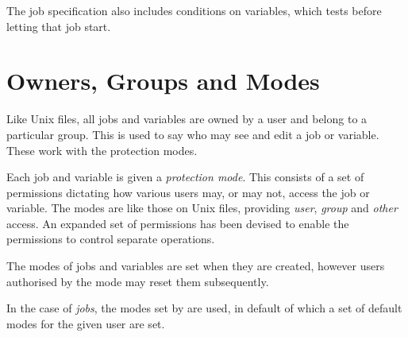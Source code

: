 The job specification also includes conditions on variables, which
\ProductName{} tests before letting that job start.

\section{Owners, Groups and Modes}
Like Unix files, all jobs and variables are owned by a user and belong
to a particular group. This is used to say who may see and edit a job
or variable. These work with the protection modes.

Each job and variable is given a \textit{protection mode}. This consists
of a set of permissions dictating how various users may, or may not,
access the job or variable. The modes are like those on Unix files,
providing \textit{user}, \textit{group} and \textit{other} access. An
expanded set of permissions has been devised to enable the permissions
to control separate operations.

The modes of jobs and variables are set when they are created, however
users authorised by the mode may reset them subsequently.

In the case of \textit{jobs}, the modes set by
 are used, in default of which a set of
default modes for the given user are set.

